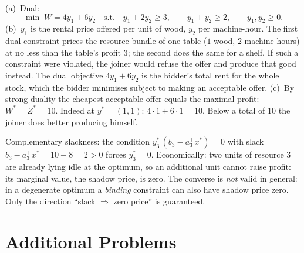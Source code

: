 \begin{solutions}
  \item (a)~Dual:
        \[
          \min\; W=4y_{1}+6y_{2}
          \quad\text{s.t.}\quad
          y_{1}+2y_{2}\ge 3,\qquad y_{1}+y_{2}\ge 2,\qquad
          y_{1},y_{2}\ge 0 .
        \]
        (b)~$y_{1}$ is the rental price offered per unit of wood, $y_{2}$
        per machine-hour. The first dual constraint prices the resource
        bundle of one table ($1$ wood, $2$ machine-hours) at no less than
        the table's profit $3$; the second does the same for a shelf. If
        such a constraint were violated, the joiner would refuse the
        offer and produce that good instead. The dual objective
        $4y_{1}+6y_{2}$ is the bidder's total rent for the whole stock,
        which the bidder minimises subject to making an acceptable offer.
        (c)~By strong duality the cheapest acceptable offer equals the
        maximal profit: $W^{*}=Z^{*}=10$. Indeed at $y^{*}=(1,1)$:
        $4\cdot 1+6\cdot 1=10$. Below a total of $10$ the joiner does
        better producing himself.

  \item Complementary slackness: the condition
        $y_{3}^{*}\,(b_{3}-a_{3}^{\top}x^{*})=0$ with slack
        $b_{3}-a_{3}^{\top}x^{*}=10-8=2>0$ forces $y_{3}^{*}=0$.
        Economically: two units of resource 3 are already lying idle at
        the optimum, so an additional unit cannot raise profit: its
        marginal value, the shadow price, is zero. The converse is
        \emph{not} valid in general: in a degenerate optimum a
        \emph{binding} constraint can also have shadow price zero. Only
        the direction ``slack $\Rightarrow$ zero price'' is guaranteed.
\end{solutions}

\section{Additional Problems}

